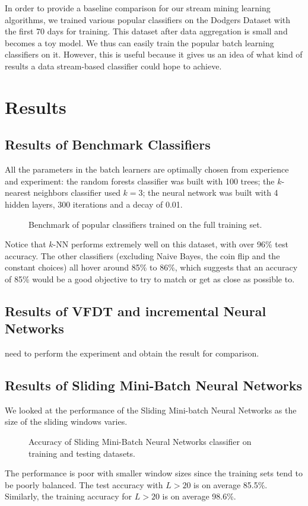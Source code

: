 \documentclass[conference]{IEEEtran}
\begin{document}
		In order to provide a baseline comparison for our stream mining learning algorithms, we trained various popular classifiers on the Dodgers Dataset with the first 70 days for training. This dataset after data aggregation is small and becomes a toy model. We thus can easily train the popular batch learning classifiers on it. However, this is useful because it gives us an idea of what kind of results a data stream-based classifier could hope to achieve.
		
		\section{Results}
		\label{sec:experiments-and-results}
		
		\subsection{Results of Benchmark Classifiers}
		All the parameters in the batch learners are optimally chosen from experience and experiment: the random forests classifier was built with 100 trees; the $k$-nearest neighbors classifier used $k=3$; the neural network was built with 4 hidden layers, 300 iterations and a decay of 0.01.
		
		\begin{figure}[H]
			\centering
			\caption{Benchmark of popular classifiers trained on the full training set.}
			\label{fig:benchmark}
		\end{figure}
		
		Notice that $k$-NN performs extremely well on this dataset, with over 96\% test accuracy. The other classifiers (excluding Naive Bayes, the coin flip and the constant choices) all hover around 85\% to 86\%, which suggests that an accuracy of 85\% would be a good objective to try to match or get as close as possible to.
		
		\subsection{Results of VFDT and incremental Neural Networks}
		need to perform the experiment and obtain the result for comparison.
		\subsection{Results of Sliding Mini-Batch Neural Networks}
		
		We looked at the performance of the Sliding Mini-batch Neural Networks as the size of the sliding windows varies.
		\begin{figure}[H]
			\centering
			\caption{Accuracy of Sliding Mini-Batch Neural Networks classifier on training and testing datasets.}
			\label{fig:benchmark}
		\end{figure}
		The performance is poor with smaller window sizes since the training sets tend to be poorly balanced. The test accuracy with $L > 20$ is on average 85.5\%. Similarly, the training accuracy for $L > 20$ is on average 98.6\%.
		
\end{document}
